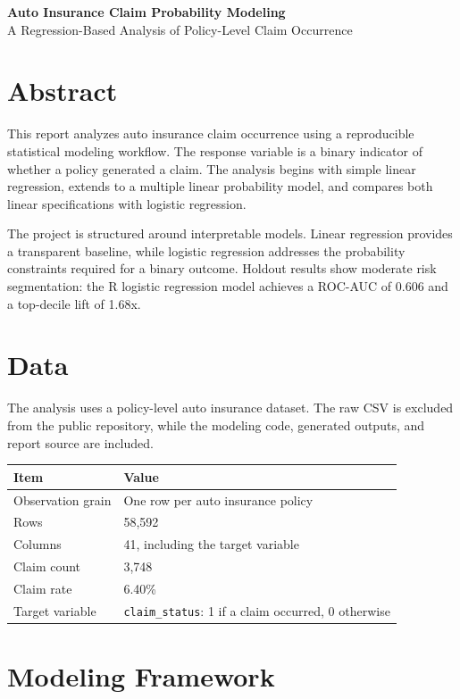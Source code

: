 \documentclass[11pt,letterpaper]{article}
\begin{document}
\begin{center}
{\Large\bfseries Auto Insurance Claim Probability Modeling}\\[0.25em]
{\large A Regression-Based Analysis of Policy-Level Claim Occurrence}
\end{center}

\vspace{0.8em}
\section*{Abstract}

This report analyzes auto insurance claim occurrence using a reproducible statistical modeling workflow. The response variable is a binary indicator of whether a policy generated a claim. The analysis begins with simple linear regression, extends to a multiple linear probability model, and compares both linear specifications with logistic regression.

The project is structured around interpretable models. Linear regression provides a transparent baseline, while logistic regression addresses the probability constraints required for a binary outcome. Holdout results show moderate risk segmentation: the R logistic regression model achieves a ROC-AUC of 0.606 and a top-decile lift of 1.68x.

\section{Data}

The analysis uses a policy-level auto insurance dataset. The raw CSV is excluded from the public repository, while the modeling code, generated outputs, and report source are included.

\begin{tabularx}{\textwidth}{B{1.8in}X}
\toprule
Item & Value \\
\midrule
Observation grain & One row per auto insurance policy \\
Rows & 58,592 \\
Columns & 41, including the target variable \\
Claim count & 3,748 \\
Claim rate & 6.40\% \\
Target variable & \texttt{claim\_status}: 1 if a claim occurred, 0 otherwise \\
\bottomrule
\end{tabularx}

\section{Modeling Framework}
\end{document}

